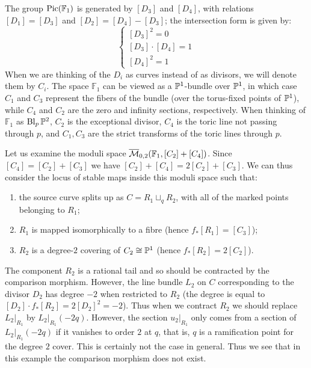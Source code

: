 The group $\operatorname{Pic}(\mathbb F_1)$ is generated by $[D_3]$ and $[D_4]$, with relations $[D_1]=[D_3]$ and $[D_2]=[D_4]-[D_3]$; the intersection form is given by:
\[
{}
\begin{cases}
 [D_3]^2=0 \\
 [D_3]\cdot [D_4]=1 \\
 [D_4]^2=1
\end{cases} 
\]
When we are thinking of the $D_i$ as curves instead of as divisors, we will denote them by $C_i$. The space $\mathbb F_1$ can be viewed as a $\mathbb P^1$-bundle over $\mathbb P^1$, in which case $C_1$ and $C_3$ represent the fibers of the bundle (over the torus-fixed points of $\mathbb P^1$), while $C_4$ and $C_2$ are the zero and infinity sections, respectively. When thinking of $\mathbb F_1$ as $\operatorname{Bl}_{p}\mathbb P^2$, $C_2$ is the exceptional divisor, $C_4$ is the toric line not passing through $p$, and $C_1,C_3$ are the strict transforms of the toric lines through $p$.

Let us examine the moduli space $\overline{\mathcal{M}}_{0,2}(\mathbb F_1,[C_2]+[C_4])$. Since $[C_4] = [C_2]+[C_3]$ we have $[C_2]+[C_4] = 2[C_2] + [C_3]$. We can thus consider the locus of stable maps inside this moduli space such that:
\begin{enumerate}
\item the source curve splits up as $C=R_1 \sqcup_q R_2$, with all of the marked points belonging to $R_1$;
\item $R_1$ is mapped isomorphically to a fibre (hence $f_*[R_1] = [C_3]$);
\item $R_2$ is a degree-$2$ covering of $C_2 \cong \mathbb P^1$ (hence $f_*[R_2]=2[C_2]$).
\end{enumerate}
The component $R_2$ is a rational tail and so should be contracted by the comparison morphism. However, the line bundle $L_2$ on $C$ corresponding to the divisor $D_2$ has degree $-2$ when restricted to $R_2$ (the degree is equal to $[D_2] \cdot f_*[R_2]=2[D_2]^2 = -2$). Thus when we contract $R_2$ we should replace $L_2|_{R_1}$ by $L_2|_{R_1}(-2q)$. However, the section $u_2|_{R_1}$ only comes from a section of $L_2|_{R_1}(-2q)$ if it vanishes to order $2$ at $q$, that is, $q$ is a ramification point for the degree $2$ cover. This is certainly not the case in general. Thus we see that in this example the comparison morphism does not exist.

\begin{comment}

\textcolor{blue}{Something is going on here: in this case there is a boundary component where the map is of the type that we have just described, and the requirement that $u_{2|R_1}$ vanishes of order $2$ at the node defines precisely the intersection with the main component. Check this. Could we possibly exploit this phenomenon to define a smaller compactification, possibly even smaller than quasimaps?} 

\end{comment}